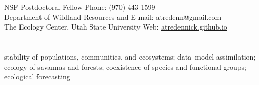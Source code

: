 \documentclass[margin,line]{resume}
\begin{document}
\begin{resume}

    \section{\textmd{\textsf{\color{MidnightBlue}{Contact\\Information}}}}

    NSF Postdoctoral Fellow      							 \hfill Phone: (970) 443-1599            \vspace{0mm}\\\vspace{0mm}%
    Department of Wildland Resources and    		          \hfill E-mail: atredenn@gmail.com    \vspace{0mm}\\\vspace{0mm}%
    The Ecology Center, Utah State University      	          \hfill Web: \href{http://atredennick.github.io}{atredennick.github.io}  \vspace{0mm}\\\vspace{-4.5mm}%

    \section{\textmd{\textsf{\color{MidnightBlue}{Research\\Interests}}}}
		stability of populations, communities, and ecosystems; data--model assimilation; ecology of savannas and forests; coexistence of species and functional groups; ecological forecasting %

\end{resume}
\end{document}
